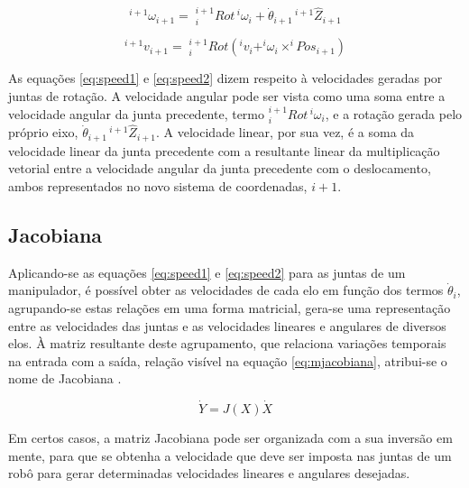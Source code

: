 \begin{equation}
    \label{eq:speed1}
    ^{i+1}\omega_{i+1} = \; ^{i+1}_iRot\,^i\omega_i + \dot{\theta}_{i+1}\,^{i+1}\hat{Z}_{i+1}
\end{equation}

\begin{equation}
    \label{eq:speed2}
    ^{i+1}v_{i+1} = \; ^{i+1}_iRot\left(^iv_i+^i\omega_i\times ^iPos_{i+1}\right)
\end{equation}

As equações \ref{eq:speed1} e \ref{eq:speed2} dizem respeito à velocidades
geradas por juntas de rotação. A velocidade angular pode ser vista 
como uma soma entre a velocidade angular da junta precedente, 
termo $^{i+1}_iRot\,^i\omega_i$, e a rotação gerada pelo próprio eixo,
$\dot{\theta}_{i+1}\,^{i+1}\hat{Z}_{i+1}$. 
A velocidade linear, por sua vez, é a soma da velocidade linear da 
junta precedente com a resultante linear da multiplicação vetorial
entre a velocidade angular da junta precedente com o deslocamento, 
ambos representados no novo sistema de coordenadas, $i+1$.

\subsection{Jacobiana}
\label{sec:jacobiana}

Aplicando-se as equações \ref{eq:speed1} e \ref{eq:speed2} para as juntas
de um manipulador, é possível obter as velocidades de cada elo em função
dos termos $\dot{\theta}_i$, agrupando-se estas relações em uma forma matricial,
gera-se uma representação entre as velocidades das juntas e as velocidades
lineares e angulares de diversos elos. À matriz resultante deste 
agrupamento, que relaciona variações temporais na entrada com 
a saída, relação visível na equação \ref{eq:mjacobiana}, atribui-se o 
nome de Jacobiana \cite{craig2009introduction}.

\begin{equation}
    \label{eq:mjacobiana}
    \dot{Y} = J(X)\dot{X}
\end{equation}

Em certos casos, a matriz Jacobiana pode ser organizada com a sua 
inversão em mente, para que se obtenha a velocidade que deve ser 
imposta nas juntas de um robô para gerar determinadas velocidades
lineares e angulares desejadas.